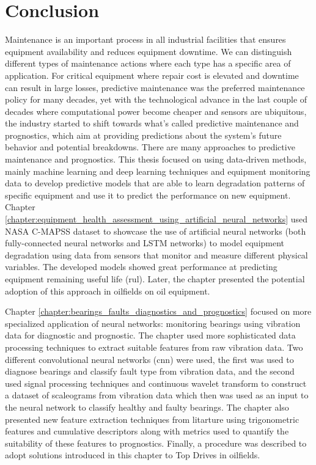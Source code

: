\chapter*{Conclusion}
Maintenance is an important process in all industrial facilities that ensures equipment availability and reduces equipment downtime. We can distinguish different types of maintenance actions where each type has a specific area of application. For critical equipment where repair cost is elevated and downtime can result in large losses, predictive maintenance was the preferred maintenance policy for many decades, yet with the technological advance in the last couple of decades where computational power become cheaper and sensors are ubiquitous, the industry started to shift towards what's called predictive maintenance and prognostics, which aim at providing predictions about the system's future behavior and potential breakdowns. There are many approaches to predictive maintenance and prognostics. This thesis focused on using data-driven methods, mainly machine learning and deep learning techniques and equipment monitoring data to develop predictive models that are able to learn degradation patterns of specific equipment and use it to predict the performance on new equipment. Chapter \ref{chapter:equipment_health_assessment_using_artificial_neural_networks} used NASA C-MAPSS dataset to showcase the use of artificial neural networks (both fully-connected neural networks and LSTM networks) to model equipment degradation using data from sensors that monitor and measure different physical variables. The developed models showed great performance at predicting equipment remaining useful life (\acrshort{rul}). Later, the chapter presented the potential adoption of this approach in oilfields on oil equipment.

Chapter \ref{chapter:bearings_faults_diagnostics_and_prognostics} focused on more specialized application of neural networks: monitoring bearings using vibration data for diagnostic and prognostic. The chapter used more sophisticated data processing techniques to extract suitable features from raw vibration data. Two different convolutional neural networks (\acrshort{cnn}) were  used, the first was used to diagnose bearings and classify fault type from vibration data, and the second used signal processing techniques and continuous wavelet transform to construct a dataset of scaleograms from vibration data which then was used as an input to the neural network to classify healthy and faulty bearings. The chapter also presented new feature extraction techniques from litarture using trigonometric features and cumulative descriptors along with metrics used to quantify the suitability of these features to prognostics. Finally, a procedure was described to adopt solutions introduced in this chapter to Top Drives in oilfields.
